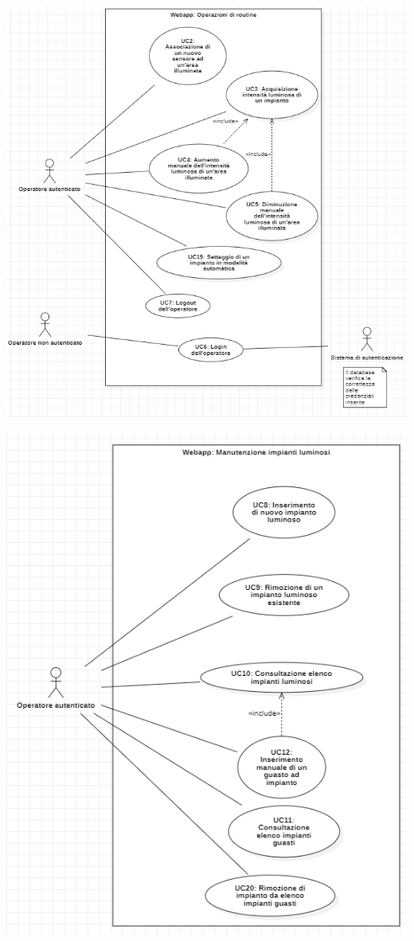 \documentclass[a4paper, 12pt]{article}
\begin{document}
\includegraphics[scale=0.65]{diagramma_use_case_2.png}

\includegraphics[scale=0.7]{diagramma_use_case_3.png}
\end{document}
